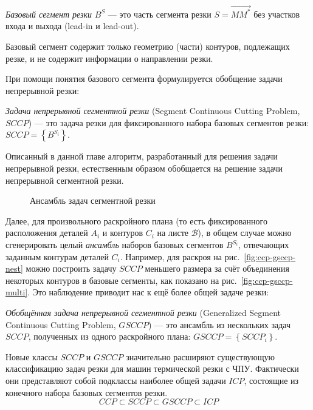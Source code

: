 \textit{Базовый сегмент резки}
$B^S$
---
это часть сегмента резки
$S = \overrightarrow{M M^*}$
без участков входа и выхода
(lead-in и lead-out).

Базовый сегмент содержит только геометрию
(части) контуров, подлежащих резке,
и не содержит информации о направлении резки.

При помощи понятия базового сегмента
формулируется обобщение задачи непрерывной резки:

\textit{Задача непрерывной сегментной резки}
(Segment Continuous Cutting Problem, $SCCP$)
--- это задача резки
для фиксированного набора базовых сегментов резки:
$SCCP = \left\{B^{S_i}\right\}$.

Описанный в данной главе алгоритм,
разработанный для решения задачи непрерывной резки,
естественным образом обобщается на решение
задачи непрерывной сегментной резки.

\begin{figure}
  \centering
  \caption{Ансамбль задач сегментной резки}
  \label{fig:ccp-gsccp}
\end{figure}

Далее, для произвольного раскройного плана
(то есть фиксированного расположения деталей $A_i$
и контуров $C_i$ на листе $\mathcal B$),
в общем случае можно сгенерировать целый
\textit{ансамбль}
наборов базовых сегментов $B^{S_i}$,
отвечающих заданным контурам деталей $C_i$.
Например,
для раскроя
на рис.~\ref{fig:ccp-gsccp-nest}
можно построить задачу $SCCP$
меньшего размера за счёт
объединения некоторых контуров в базовые сегменты,
как показано на рис.~\ref{fig:ccp-gsccp-multi}.
Это наблюдение приводит нас к ещё более общей задаче резки:

\textit{Обобщённая задача непрерывной сегментной резки}
(Generalized Segment Continuous Cutting Problem, $GSCCP$)
--- это ансамбль из нескольких задач
$SCCP$,
полученных из одного раскройного плана:
$GSCCP = \left\{ SCCP_i \right\}$.

Новые классы
$SCCP$ и $GSCCP$
значительно расширяют существующую классификацию
задач резки для машин термической резки с ЧПУ.
Фактически они представляют собой подклассы
наиболее общей задачи $ICP$,
состоящие из конечного набора базовых сегментов резки.
$$
CCP \subset SCCP \subset GSCCP \subset ICP
$$

